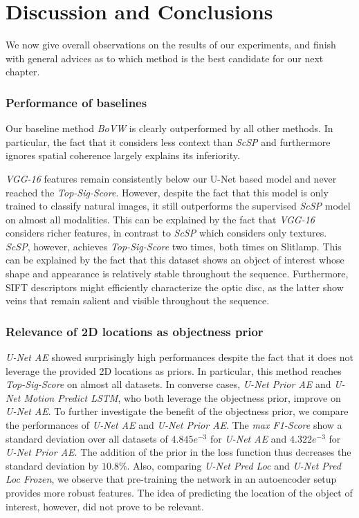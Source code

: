 \section{Discussion and Conclusions}

We now give overall observations on the results of our experiments, and finish with general advices
as to which method is the best candidate for our next chapter.

\subsubsection{Performance of baselines}
Our baseline method \textit{BoVW} is clearly outperformed by all other methods.
In particular, the fact that it considers less context than \textit{ScSP} and furthermore ignores spatial coherence largely explains its inferiority.

\textit{VGG-16} features remain consistently below our U-Net based model and never reached the \textit{Top-Sig-Score}.
However, despite the fact that this model is only trained to classify natural images, it still outperforms the supervised \textit{ScSP} model on almost all modalities.
This can be explained by the fact that \textit{VGG-16} considers richer features, in contrast to \textit{ScSP} which considers only textures.
\textit{ScSP}, however, achieves \textit{Top-Sig-Score} two times, both times on Slitlamp.
This can be explained by the fact that this dataset shows an object of interest whose shape and appearance is relatively stable throughout the sequence.
Furthermore, SIFT descriptors might efficiently characterize the optic disc, as the latter show veins that remain salient and visible throughout the sequence.

\subsubsection{Relevance of 2D locations as objectness prior}
\textit{U-Net AE} showed surprisingly high performances despite the fact that it does not leverage the provided 2D locations as priors.
In particular, this method reaches \textit{Top-Sig-Score} on almost all datasets.
In converse cases, \textit{U-Net Prior AE} and \textit{U-Net Motion Predict LSTM}, who both leverage the objectness prior, improve on \textit{U-Net AE}.
To further investigate the benefit of the objectness prior, we compare the performances of \textit{U-Net AE} and \textit{U-Net Prior AE}.
The \textit{max F1-Score} show a standard deviation over all datasets of $4.845e^{-3}$ for \textit{U-Net AE} and $4.322e^{-3}$ for \textit{U-Net Prior AE}.
The addition of the prior in the loss function thus decreases the standard deviation by $10.8\%$.
Also, comparing \textit{U-Net Pred Loc} and \textit{U-Net Pred Loc Frozen}, we observe that pre-training the network in an autoencoder setup provides more robust features.
The idea of predicting the location of the object of interest, however, did not prove to be relevant.

